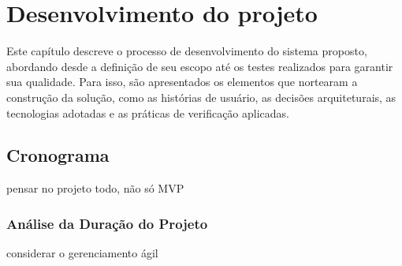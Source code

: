 	\chapter{Desenvolvimento do projeto}

	Este capítulo descreve o processo de desenvolvimento do sistema proposto, abordando desde a definição de seu escopo até os testes realizados para garantir sua qualidade. Para isso, são apresentados os elementos que nortearam a construção da solução, como as histórias de usuário, as decisões arquiteturais, as tecnologias adotadas e as práticas de verificação aplicadas.
	
	
	
	
	
	
	
	
	
	

	\section{Cronograma}
	pensar no projeto todo, não só MVP
	\subsection{Análise da Duração do Projeto}
	considerar o gerenciamento ágil